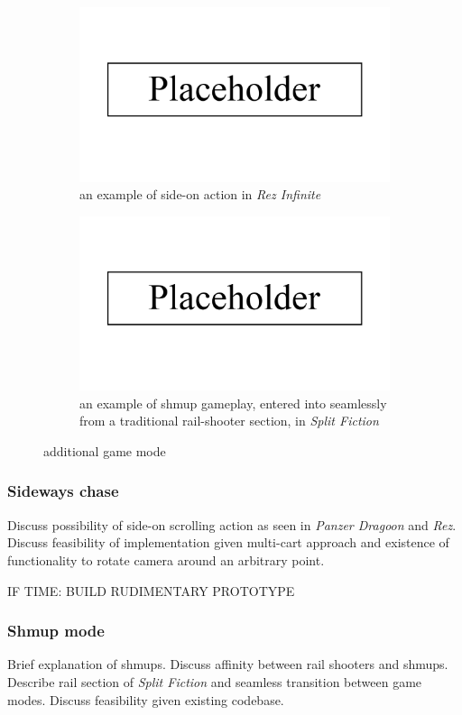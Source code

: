 \documentclass{article}
\begin{document}
\begin{figure}[h]
\begin{subfigure}{.45\textwidth}
  \centering
  \includegraphics[width=.8\linewidth]{placeholder}
  \caption{an example of side-on action in \textit{Rez Infinite}}
  \label{fig:sideways}
\end{subfigure}\hfill
\begin{subfigure}{.45\textwidth}
  \centering
  \includegraphics[width=.8\linewidth]{placeholder}
  \caption{an example of shmup gameplay, entered into seamlessly from a traditional rail-shooter section, in \textit{Split Fiction}}
  \label{fig:shmup}
\end{subfigure}\hfill
\caption{additional game mode}
\label{fig:additionalmodes}
\end{figure}

\subsubsection*{Sideways chase}
Discuss possibility of side-on scrolling action as seen in \textit{Panzer Dragoon} and \textit{Rez}.
Discuss feasibility of implementation given multi-cart approach and existence of functionality to
rotate camera around an arbitrary point.

IF TIME: BUILD RUDIMENTARY PROTOTYPE

\subsubsection*{Shmup mode}
Brief explanation of shmups. Discuss affinity between rail shooters and shmups. Describe rail section
of \textit{Split Fiction} and seamless transition between game modes. Discuss feasibility given
existing codebase.
\end{document}
